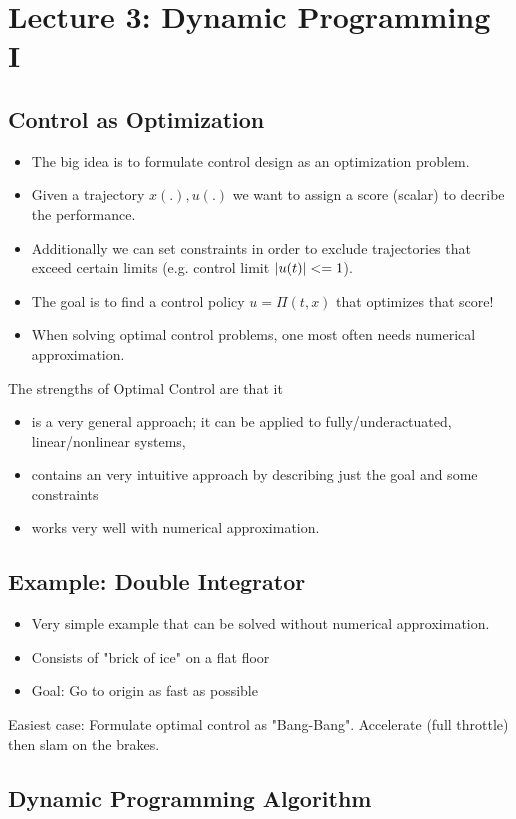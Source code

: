 \chapter{Lecture 3: Dynamic Programming I}\label{lecture3}
\section{Control as Optimization}
\begin{itemize}
\item The big idea is to formulate control design as an optimization problem.
\item Given a trajectory $x(.),u(.)$ we want to assign a score (scalar) to decribe the performance.
\item Additionally we can set constraints in order to exclude trajectories that exceed certain limits (e.g. control limit $\lvert u(t)\rvert<=1$).
\item The goal is to find a control policy $u=\Pi(t,x)$ that optimizes that score!
\item When solving optimal control problems, one most often needs numerical approximation.
\end{itemize}
The strengths of Optimal Control are that it
\begin{itemize}
\item is a very general approach; it can be applied to fully/underactuated, linear/nonlinear systems,
\item contains an very intuitive approach by describing just the goal and some constraints 
\item works very well with numerical approximation.

\end{itemize}
 
 
\section{Example: Double Integrator}\begin{itemize}
\item Very simple example that can be solved without numerical approximation.
\item Consists of "brick of ice" on a flat floor
\item Goal: Go to origin as fast as possible
\end{itemize}
Easiest case: Formulate optimal control as "Bang-Bang". Accelerate (full throttle) then slam on the brakes.


\section{Dynamic Programming Algorithm}
